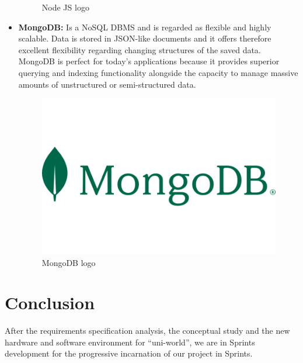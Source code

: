 \begin{itemize}
\begin{figure}[H]
                \caption{Node JS logo } 
                \label{fig: Node JS logo}
            \end{figure}    
    \item \textbf{MongoDB:} Is a NoSQL DBMS and is regarded as flexible and highly scalable. Data is stored in JSON-like documents and it offers therefore excellent flexibility regarding changing structures of the saved data. MongoDB is perfect for today’s applications because it provides superior querying and indexing functionality alongside the capacity to manage massive amounts of unstructured or semi-structured data.
            \begin{figure}[H] 
                \centering
                \includegraphics[scale=0.3]{logos/mongo-logo.png}
                \caption{MongoDB logo } 
                \label{fig: MongoDB logo}
            \end{figure} 
\end{itemize}

\section*{Conclusion}
After the requirements specification analysis, the conceptual study and the new hardware and software environment for “uni-world”, we are in Sprints development for the progressive incarnation of our project in Sprints.

